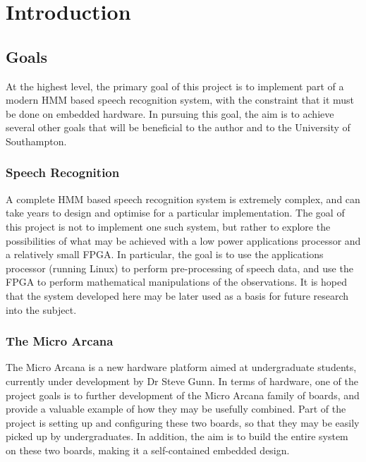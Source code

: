 \chapter{Introduction} %
\label{cha:introduction}


\section{Goals} %
\label{sec:goals}
	At the highest level, the primary goal of this project is to implement part of a modern HMM based speech recognition system, with the constraint that it must be done on embedded hardware.  In pursuing this goal, the aim is to achieve several other goals that will be beneficial to the author and to the University of Southampton.

	\subsection{Speech Recognition} %
	\label{sec:speech_recognition}
		A complete HMM based speech recognition system is extremely complex, and can take years to design and optimise for a particular implementation.  The goal of this project is not to implement one such system, but rather to explore the possibilities of what may be achieved with a low power applications processor and a relatively small FPGA.  In particular, the goal is to use the applications processor (running Linux) to perform pre-processing of speech data, and use the FPGA to perform mathematical manipulations of the observations.  It is hoped that the system developed here may be later used as a basis for future research into the subject.

	\subsection{The Micro Arcana} %
	\label{sec:the_micro_arcana}
		The Micro Arcana is a new hardware platform aimed at undergraduate students, currently under development by Dr Steve Gunn.  
		In terms of hardware, one of the project goals is to further development of the Micro Arcana family of boards, and provide a valuable example of how they may be usefully combined.  Part of the project is setting up and configuring these two boards, so that they may be easily picked up by undergraduates.  In addition, the aim is to build the entire system on these two boards, making it a self-contained embedded design.

